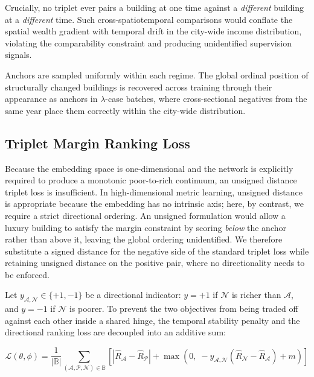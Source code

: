 \documentclass{article}
\begin{document}
Crucially, no triplet ever pairs a building at one time against a \textit{different} building at a \textit{different} time. Such cross-spatiotemporal comparisons would conflate the spatial wealth gradient with temporal drift in the city-wide income distribution, violating the comparability constraint and producing unidentified supervision signals.

Anchors are sampled uniformly within each regime. The global ordinal position of structurally changed buildings is recovered across training through their appearance as anchors in $\lambda$-case batches, where cross-sectional negatives from the same year place them correctly within the city-wide distribution.

\subsection{Triplet Margin Ranking Loss}

Because the embedding space is one-dimensional and the network is explicitly required to produce a monotonic poor-to-rich continuum, an unsigned distance triplet loss is insufficient. In high-dimensional metric learning, unsigned distance is appropriate because the embedding has no intrinsic axis; here, by contrast, we require a strict directional ordering. An unsigned formulation would allow a luxury building to satisfy the margin constraint by scoring \textit{below} the anchor rather than above it, leaving the global ordering unidentified. We therefore substitute a signed distance for the negative side of the standard triplet loss while retaining unsigned distance on the positive pair, where no directionality needs to be enforced.

Let $y_{\mathcal{A},\mathcal{N}} \in \{+1, -1\}$ be a directional indicator: $y = +1$ if $\mathcal{N}$ is richer than $\mathcal{A}$, and $y = -1$ if $\mathcal{N}$ is poorer. To prevent the two objectives from being traded off against each other inside a shared hinge, the temporal stability penalty and the directional ranking loss are decoupled into an additive sum:

\begin{equation}
\mathcal{L}(\theta, \phi) = \frac{1}{|\mathbb{B}|} \sum_{(\mathcal{A}, \mathcal{P}, \mathcal{N}) \in \mathbb{B}} \left[ \left|\hat{R}_\mathcal{A} - \hat{R}_\mathcal{P}\right| + \max\!\left(0,\; -y_{\mathcal{A},\mathcal{N}}\!\left(\hat{R}_\mathcal{N} - \hat{R}_\mathcal{A}\right) + m \right) \right]
\end{equation}
\end{document}
